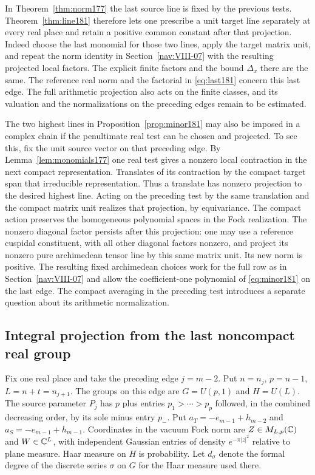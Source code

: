 \documentclass[a4paper,11pt]{article}
\theoremstyle{definition}
\theoremstyle{remark}
\numberwithin{equation}{section}
\begin{document}
In Theorem~\ref{thm:norm177} the last source line is fixed by
the previous tests. Theorem~\ref{thm:line181} therefore lets
one prescribe a unit target line separately at every real
place and retain a positive common constant after that
projection. Indeed choose the last monomial for those two
lines, apply the target matrix unit, and repeat the norm
identity in Section~\ref{nav:VIII-07} with the resulting projected local
factors. The explicit finite factors and the bound
\(\Delta_x\) there are the same. The reference real norm and
the factorial in \eqref{eq:last181} concern this last edge.
The full arithmetic projection also acts on the finite
classes, and its valuation and the normalizations on the
preceding edges remain to be estimated.

The two highest lines in Proposition~\ref{prop:minor181} may
also be imposed in a complex chain if the penultimate real
test can be chosen and projected. To see this, fix the unit
source vector on that preceding edge. By Lemma~\ref{lem:monomials177}
one real test gives a nonzero local contraction in the next
compact representation. Translates of its contraction by
the compact target span that irreducible representation.
Thus a translate has nonzero projection to the desired
highest line. Acting on the preceding test by the same
translation and the compact matrix unit realizes that
projection, by equivariance. The compact action preserves
the homogeneous polynomial spaces in the Fock realization.
The nonzero diagonal factor persists after this projection:
one may use a reference cuspidal constituent, with all other
diagonal factors nonzero, and project its nonzero pure
archimedean tensor line by this same matrix unit. Its new
norm is positive. The resulting fixed archimedean choices
work for the full row as in Section~\ref{nav:VIII-07} and allow the
coefficient-one polynomial of \eqref{eq:minor181} on the last
edge. The compact averaging in the preceding test introduces
a separate question about its arithmetic normalization.

\subsection{Integral projection from the last noncompact real group}\label{nav:VIII-10}
\label{sec:next185}

Fix one real place and take the preceding edge \(j=m-2\).
Put \(n=n_j\), \(p=n-1\), \(L=n+t=n_{j+1}\). The groups
on this edge are \(G=U(p,1)\) and \(H=U(L)\).
The source parameter \(P_j\) has \(p\) plus entries
\(p_1>\cdots>p_p\) followed, in the combined decreasing
order, by its sole minus entry \(p_-\).
Put \(a_T=-e_{m-1}+h_{m-2}\) and \(a_S=-e_{m-1}+h_{m-1}\).
Coordinates in the vacuum Fock norm are
\(Z\in M_{L,p}(\mathbb C)\) and \(W\in\mathbb C^L\), with independent
Gaussian entries of density \(e^{-\pi |z|^2}\) relative to
plane measure. Haar measure on \(H\) is probability.
Let \(d_\sigma\) denote the formal degree of the discrete
series \(\sigma\) on \(G\) for the Haar measure used there.
\end{document}
